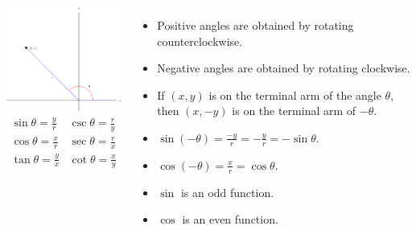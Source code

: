 \begin{frame}
\begin{columns}[c]
\includegraphics[width=5cm]{trigonometry/pictures/app-d-ratiosb.pdf}%
\[
\begin{array}{cc}
\sin \theta = \frac{ y}{ r} &
\csc \theta = \frac{ r}{ y} \\
\cos \theta = \frac{ x}{ r} &
\sec \theta = \frac{ r}{ x} \\
\tan \theta = \frac{ y}{ x} &
\cot \theta = \frac{ x}{ y} \\
\end{array}
\]
\begin{itemize}
\item<2->  Positive angles are obtained by rotating counterclockwise.
\item<2->  Negative angles are obtained by rotating clockwise.
\item<3->  If $(x,y)$ is on the terminal arm of the angle $\theta$, then $(x, -y)$ is on the terminal arm of $-\theta$.
\item<4->  $\sin(-\theta ) = \frac{-y}{r} = -\frac{y}{r} = -\sin \theta$.
\item<5->  $\cos(-\theta ) = \frac{x}{r} = \cos \theta$.
\item<6->  $\sin$ is an odd function.
\item<7->  $\cos$ is an even function.
\end{itemize}
\end{columns}
\end{frame}



